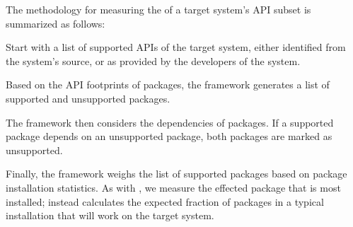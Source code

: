 
The methodology for measuring the \compatmetric{} of a target system's API subset is summarized as follows:
\begin{compactenum}
\item Start with a list of supported APIs of the target system, either identified from the system's source, or as provided by the developers of the system.
\item Based on the API footprints of packages, the framework generates a list of supported and unsupported packages.
\item The framework then considers the dependencies of packages. If a supported package depends on an unsupported package, both packages are marked as unsupported.
\item Finally, the framework weighs the list of supported packages based on package installation statistics.
As with \usagemetric{}, we measure the effected package that is most installed;
\compatmetric{} instead calculates the expected fraction of packages in a typical installation that will work on the target system.
\end{compactenum}

\begin{comment}
\paragraph{Formal Definition.}
Suppose an OS supports a set of APIs ($\mathtt{API}_\mathtt{Supported}$),
which is a subset of the APIs of the original system ($\mathtt{API}_\mathtt{all}$).
In this study, $\mathtt{API}_\mathtt{all}$ is the sum of Linux APIs, including
the system call table, sysctl, proc, and so forth.
A list of supported packages ($\mathtt{Pkg}_\mathtt{Supported}$) can be generated by checking whether the API footprint is
a subset of the target system's supported APIs ($\mathtt{API}_\mathtt{Supported}$):
\begin{align*}
\mathtt{Pkg}_\mathtt{Supported} = \{\mathtt{pkg} | \mathtt{Footprint}_\mathtt{pkg} \subseteq \mathtt{API}_\mathtt{Supported}\}
\end{align*}
\end{comment}


